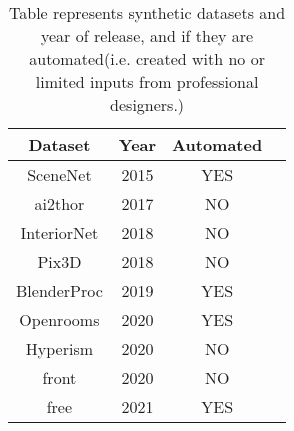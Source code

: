 \begin{table}[ht]
    \centering
    \begin{tabular}{|c |c |c |c|}
        \hline
        Dataset & Year & Automated \\ [0.5ex]
        \hline\hline
        SceneNet & 2015 & YES \\
        \hline
        \gls{ai2thor} & 2017 & NO \\
        \hline
        InteriorNet & 2018 & NO \\
        \hline
        Pix3D & 2018 & NO \\
        \hline
        BlenderProc & 2019 & YES \\
        \hline
        Openrooms & 2020 & YES \\
        \hline
        Hyperism & 2020 & NO \\
        \hline
        \gls{front} & 2020 & NO \\
        \hline
        \gls{free} & 2021 & YES \\[1ex]
        \hline
    \end{tabular}
    \caption[Synthetic Datasets]{Table represents synthetic datasets and year of release, and if they are automated(i.e. created with no or limited inputs from professional designers.)}
    \label{tab:dataset_comparison}
\end{table}

